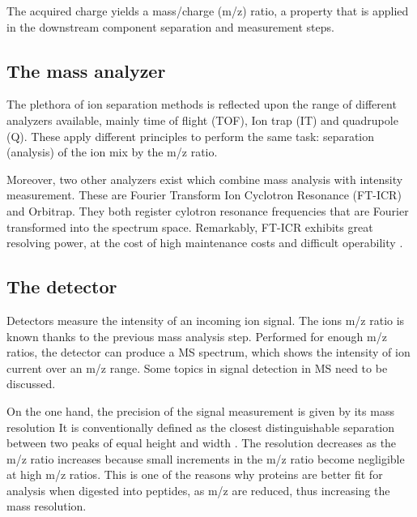 The acquired charge yields a mass/charge (\ac{m/z}) ratio, a property that is applied in the downstream component separation and measurement steps.

\subsection{The mass analyzer}
\label{subsec:the_mass_analyzer}

The plethora of ion separation methods is reflected upon the range of different analyzers available, mainly time of flight (\ac{TOF}), Ion trap (\ac{IT}) and quadrupole (\ac{Q}). These apply different principles to perform the same task: separation (analysis) of the ion mix by the \ac{m/z} ratio.

Moreover, two other analyzers exist which combine mass analysis with intensity measurement. These are Fourier Transform Ion Cyclotron Resonance (\ac{FT-ICR}) and Orbitrap. They both register cylotron resonance frequencies that are Fourier transformed into the spectrum space. Remarkably, \ac{FT-ICR} exhibits great resolving power, at the cost of high maintenance costs and difficult operability \cite{Barsnes2008}. 

\subsection{The detector}
\label{subsec:the_detector}

Detectors measure the intensity of an incoming ion signal. The ion\textquotesingle s \ac{m/z} ratio is known thanks to the previous mass analysis step. Performed for enough \ac{m/z} ratios, the detector can produce a \ac{MS} spectrum, which shows the intensity of ion current over an \ac{m/z} range. Some topics in signal detection in \ac{MS} need to be discussed.

On the one hand, the precision of the signal measurement is given by its mass resolution It is conventionally defined as the closest distinguishable separation between two peaks of equal height and width \cite{Marshall2013}. The resolution decreases as the \ac{m/z} ratio increases because small increments in the \ac{m/z} ratio become negligible at high \ac{m/z} ratios. This is one of the reasons why proteins are better fit for analysis when digested into peptides, as \ac{m/z} are reduced, thus increasing the mass resolution.

